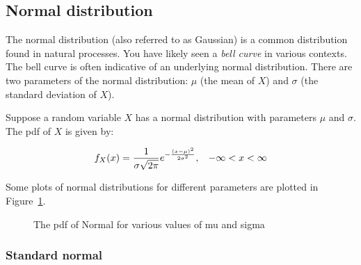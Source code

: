 \documentclass[
  letterpaper,
  DIV=11,
  numbers=noendperiod]{scrreprt}
\begin{document}
\subsection{Normal distribution}\label{normal-distribution}

The normal distribution (also referred to as Gaussian) is a common
distribution found in natural processes. You have likely seen a
\emph{bell curve} in various contexts. The bell curve is often
indicative of an underlying normal distribution. There are two
parameters of the normal distribution: \(\mu\) (the mean of \(X\)) and
\(\sigma\) (the standard deviation of \(X\)).

Suppose a random variable \(X\) has a normal distribution with
parameters \(\mu\) and \(\sigma\). The pdf of \(X\) is given by:

\[
f_X(x)=\frac{1}{\sigma\sqrt{2\pi}}e^{-\frac{(x-\mu)^2}{2\sigma^2}}, \hspace{0.3cm} -\infty < x <\infty
\]

Some plots of normal distributions for different parameters are plotted
in Figure~\ref{fig-norm}.

\begin{figure}


\caption{\label{fig-norm}The pdf of Normal for various values of mu and
sigma}

\end{figure}%

\subsubsection{Standard normal}\label{standard-normal}
\end{document}
